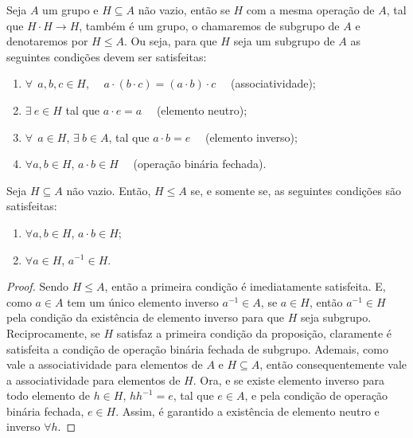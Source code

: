 \documentclass[11pt,openany]{book}
\begin{document}
    \begin{definition}
    \label{def:subgrupo}
        Seja $A$ um grupo e $H \subseteq A$ não vazio, então se $H$ com a mesma operação de $A$, tal que $H\cdot H \rightarrow H$, também é um grupo, o chamaremos de subgrupo de $A$ e denotaremos por $H \leq A$. Ou seja, para que $H$ seja um subgrupo de $A$ as seguintes condições devem ser satisfeitas:
        \begin{enumerate}[label=\Roman*)]
            \item $\forall \ \ a,b,c \in H$, \ \ $a\cdot(b\cdot c) = (a\cdot b)\cdot c$ \ \ (associatividade);
            \item $\exists \ e \in H$ tal que $a\cdot e = a$ \ \ (elemento neutro);
            \item $\forall \ \ a \in H$, $\exists \ b \in A$, tal que $a\cdot b = e$ \ \ (elemento inverso);
            \item $\forall a,b \in H$, $a\cdot b \in H$ \ \ (operação binária fechada).
        \end{enumerate}
    \end{definition}
    

    \begin{proposition}
    \label{prop:subgrupo}
        Seja $H \subseteq A$ não vazio. Então, $H \leq A$ se, e somente se, as seguintes condições são satisfeitas:
        \begin{enumerate}
            \item $\forall a,b \in H$, $a\cdot b \in H$;
            \item $\forall a \in H$, $a^{-1} \in H$.
        \end{enumerate}
    \end{proposition}
    \begin{proof}
        Sendo $H \leq A$, então a primeira condição é imediatamente satisfeita. E, como $a \in A$ tem um único elemento inverso $a^{-1} \in A$, se $a \in H$, então $a^{-1} \in H$ pela condição da existência de elemento inverso para que $H$ seja subgrupo. Reciprocamente, se $H$ satisfaz a primeira condição da proposição, claramente é satisfeita a condição de operação binária fechada de subgrupo. Ademais, como vale a associatividade para elementos de $A$ e $H \subseteq A$, então consequentemente vale a associatividade para elementos de $H$. Ora, e se existe elemento inverso para todo elemento de $h \in H$, $hh^{-1} = e$, tal que $e \in A$, e pela condição de operação binária fechada, $e \in H$. Assim, é garantido a existência de elemento neutro e inverso $\forall h$.
    \end{proof}
\end{document}

